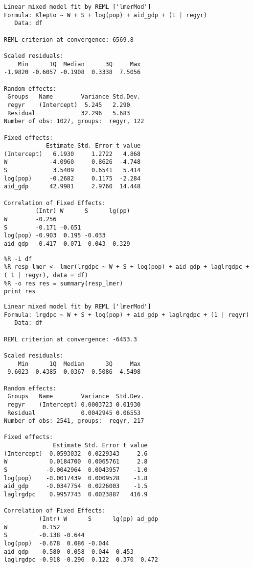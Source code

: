 \documentclass[12pt,fleqn]{article}\usepackage{common}
\begin{document}
\begin{verbatim}
Linear mixed model fit by REML ['lmerMod']
Formula: Klepto ~ W + S + log(pop) + aid_gdp + (1 | regyr)
   Data: df

REML criterion at convergence: 6569.8

Scaled residuals: 
    Min      1Q  Median      3Q     Max 
-1.9820 -0.6057 -0.1908  0.3338  7.5056 

Random effects:
 Groups   Name        Variance Std.Dev.
 regyr    (Intercept)  5.245   2.290   
 Residual             32.296   5.683   
Number of obs: 1027, groups:  regyr, 122

Fixed effects:
            Estimate Std. Error t value
(Intercept)   6.1930     1.2722   4.868
W            -4.0960     0.8626  -4.748
S             3.5409     0.6541   5.414
log(pop)     -0.2682     0.1175  -2.284
aid_gdp      42.9981     2.9760  14.448

Correlation of Fixed Effects:
         (Intr) W      S      lg(pp)
W        -0.256                     
S        -0.171 -0.651              
log(pop) -0.903  0.195 -0.033       
aid_gdp  -0.417  0.071  0.043  0.329

\end{verbatim}

\begin{verbatim}
%R -i df
%R resp_lmer <- lmer(lrgdpc ~ W + S + log(pop) + aid_gdp + laglrgdpc + ( 1 | regyr), data = df)
%R -o res res = summary(resp_lmer)
print res
\end{verbatim}

\begin{verbatim}
Linear mixed model fit by REML ['lmerMod']
Formula: lrgdpc ~ W + S + log(pop) + aid_gdp + laglrgdpc + (1 | regyr)
   Data: df

REML criterion at convergence: -6453.3

Scaled residuals: 
    Min      1Q  Median      3Q     Max 
-9.6023 -0.4385  0.0367  0.5086  4.5498 

Random effects:
 Groups   Name        Variance  Std.Dev.
 regyr    (Intercept) 0.0003723 0.01930 
 Residual             0.0042945 0.06553 
Number of obs: 2541, groups:  regyr, 217

Fixed effects:
              Estimate Std. Error t value
(Intercept)  0.0593032  0.0229343     2.6
W            0.0184700  0.0065761     2.8
S           -0.0042964  0.0043957    -1.0
log(pop)    -0.0017439  0.0009528    -1.8
aid_gdp     -0.0347754  0.0226003    -1.5
laglrgdpc    0.9957743  0.0023887   416.9

Correlation of Fixed Effects:
          (Intr) W      S      lg(pp) ad_gdp
W          0.152                            
S         -0.138 -0.644                     
log(pop)  -0.678  0.086 -0.044              
aid_gdp   -0.580 -0.058  0.044  0.453       
laglrgdpc -0.918 -0.296  0.122  0.370  0.472

\end{verbatim}
\end{document}
